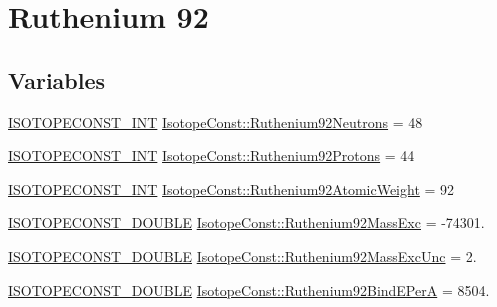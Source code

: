\hypertarget{group___isotope_const-_ruthenium-_ru92}{}\section{Ruthenium 92}
\label{group___isotope_const-_ruthenium-_ru92}
\subsection*{Variables}
\begin{DoxyCompactItemize}
\item 
\mbox{\hyperlink{group___isotope_const-_macros_ga5f18360b3e99483a35c32d789e62621c}{I\+S\+O\+T\+O\+P\+E\+C\+O\+N\+S\+T\+\_\+\+I\+NT}} \mbox{\hyperlink{group___isotope_const-_ruthenium-_ru92_gab9e437f401b0ef537cc32545033672a1}{Isotope\+Const\+::\+Ruthenium92\+Neutrons}} = 48
\item 
\mbox{\hyperlink{group___isotope_const-_macros_ga5f18360b3e99483a35c32d789e62621c}{I\+S\+O\+T\+O\+P\+E\+C\+O\+N\+S\+T\+\_\+\+I\+NT}} \mbox{\hyperlink{group___isotope_const-_ruthenium-_ru92_gab0b11ac781d2f92df0f86e9d61bfaae0}{Isotope\+Const\+::\+Ruthenium92\+Protons}} = 44
\item 
\mbox{\hyperlink{group___isotope_const-_macros_ga5f18360b3e99483a35c32d789e62621c}{I\+S\+O\+T\+O\+P\+E\+C\+O\+N\+S\+T\+\_\+\+I\+NT}} \mbox{\hyperlink{group___isotope_const-_ruthenium-_ru92_gaab24adf7e2af2a9990f2076307c4a239}{Isotope\+Const\+::\+Ruthenium92\+Atomic\+Weight}} = 92
\item 
\mbox{\hyperlink{group___isotope_const-_macros_ga8f45a7272ce02c0b4c65c44636ed719a}{I\+S\+O\+T\+O\+P\+E\+C\+O\+N\+S\+T\+\_\+\+D\+O\+U\+B\+LE}} \mbox{\hyperlink{group___isotope_const-_ruthenium-_ru92_gad776eec5a9e12d57794264cc4d1cedce}{Isotope\+Const\+::\+Ruthenium92\+Mass\+Exc}} = -\/74301.
\item 
\mbox{\hyperlink{group___isotope_const-_macros_ga8f45a7272ce02c0b4c65c44636ed719a}{I\+S\+O\+T\+O\+P\+E\+C\+O\+N\+S\+T\+\_\+\+D\+O\+U\+B\+LE}} \mbox{\hyperlink{group___isotope_const-_ruthenium-_ru92_ga46573aef54abb186aa47c81925598cad}{Isotope\+Const\+::\+Ruthenium92\+Mass\+Exc\+Unc}} = 2.
\item 
\mbox{\hyperlink{group___isotope_const-_macros_ga8f45a7272ce02c0b4c65c44636ed719a}{I\+S\+O\+T\+O\+P\+E\+C\+O\+N\+S\+T\+\_\+\+D\+O\+U\+B\+LE}} \mbox{\hyperlink{group___isotope_const-_ruthenium-_ru92_ga69d39742c193233da419abc9c4d13149}{Isotope\+Const\+::\+Ruthenium92\+Bind\+E\+PerA}} = 8504.
\item 

\end{DoxyCompactItemize}
